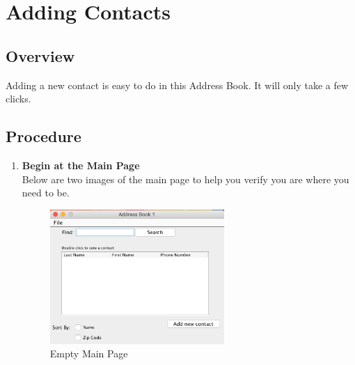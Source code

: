 \documentclass[a4paper, 11pt]{article}
\begin{document}
\clearpage

\section{Adding Contacts}
\subsection{Overview}
Adding a new contact is easy to do in this Address Book. It will only take a few clicks.
\subsection{Procedure}
\begin{enumerate}[label=\textbf{\arabic*})]
    \item{\textbf{Begin at the Main Page}}\\ Below are two images of the main page to help you verify you are where you need to be.
    
    \begin{figure}[h!]
    \centering
      \includegraphics[width=250]{main_page_empty.png}
      \caption{Empty Main Page}
    \end{figure}


\end{enumerate}
\end{document}
